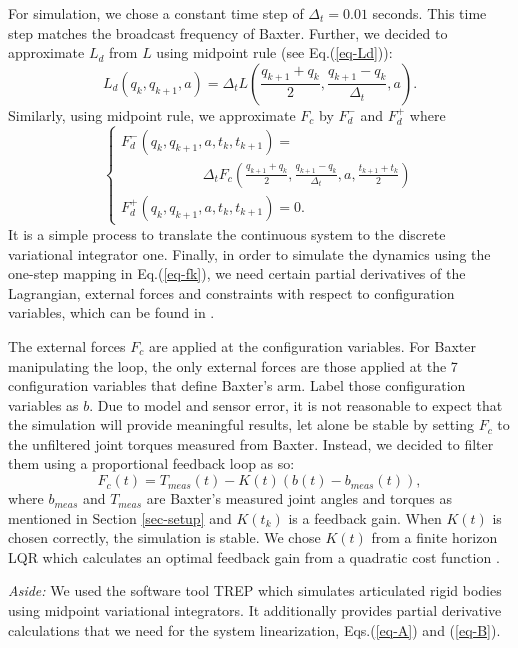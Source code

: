 \documentclass[letterpaper, 10pt, conference]{ieeeconf}
\begin{document}
For simulation, we chose a constant time step of $\Delta_t = 0.01$ seconds.  This time step matches the broadcast frequency of Baxter.  Further, we decided to approximate $L_d$ from $L$ using midpoint rule (see Eq.(\ref{eq-Ld})):
\begin{equation}
L_d(q_k,q_{k+1},a) = \Delta_t L(\frac{q_{k+1}+q_k}{2},\frac{q_{k+1}-q_k}{\Delta_t},a).
\label{eq-Ld}
\end{equation}
Similarly, using midpoint rule, we approximate $F_c$ by $F_d^-$ and $F_d^+$ where
\begin{equation}
\left\{
\begin{array}{l}
F_d^-(q_k,q_{k+1},a,t_k,t_{k+1}) = \\\hspace{70pt}\Delta_t F_c(\frac{q_{k+1}+q_k}{2},\frac{q_{k+1}-q_k}{\Delta_t},a,\frac{t_{k+1}+t_k}{2})\\
F_d^+(q_k,q_{k+1},a,t_k,t_{k+1}) = 0.
\end{array}
\right.
\label{eq-Fd}
\end{equation}
It is a simple process to translate the continuous system to the discrete variational integrator one. Finally, in order to simulate the dynamics using the one-step mapping in Eq.(\ref{eq-fk}), we need certain partial derivatives of the Lagrangian, external forces and constraints with respect to configuration variables, which can be found in \cite{johnson_murphey_scalable}.  

The external forces $F_c$ are applied at the configuration variables.  For Baxter manipulating the loop, the only external forces are those applied at the 7 configuration variables that define Baxter's arm. Label those configuration variables as $b$. Due to model and sensor error, it is not reasonable to expect that the simulation will provide meaningful results, let alone be stable by setting $F_c$ to the unfiltered joint torques measured from Baxter.  Instead, we decided to filter them using a proportional feedback loop as so:
\[
F_{c}(t) = T_{meas}(t) - K(t) (b(t) - b_{meas}(t)),
\]
where $b_{meas}$ and $T_{meas}$ are Baxter's measured joint angles and torques as mentioned in Section \ref{sec-setup} and $K(t_k)$ is a feedback gain.  When $K(t)$ is chosen correctly, the simulation is stable.  We chose $K(t)$ from a finite horizon LQR which calculates an optimal feedback gain from a quadratic cost function \cite{anderson_moore}.

\emph{Aside:}  We used the software tool TREP \cite{johnson_murphey_scalable} which simulates articulated rigid bodies using midpoint variational integrators.  It additionally provides partial derivative calculations that we need for the system linearization, Eqs.(\ref{eq-A}) and (\ref{eq-B}).  
\end{document}
